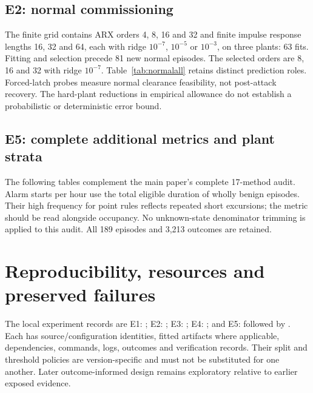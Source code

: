 \documentclass[11pt]{article}
\begin{document}
\subsection{E2: normal commissioning}
The finite grid contains ARX orders 4, 8, 16 and 32 and finite impulse response lengths 16, 32 and 64, each with ridge $10^{-7}$, $10^{-5}$ or $10^{-3}$, on three plants: 63 fits. Fitting and selection precede 81 new normal episodes. The selected orders are 8, 16 and 32 with ridge $10^{-7}$. Table~\ref{tab:normalall} retains distinct prediction roles. Forced-latch probes measure normal clearance feasibility, not post-attack recovery. The hard-plant reductions in empirical allowance do not establish a probabilistic or deterministic error bound.
\begin{table}[htbp]\centering\small
\caption{E2 complete normal-reference comparison. Each row has 29,700 eligible observations and 108 forced-latch probes. Selected reference and selected ARX are identical and appear once.}\label{tab:normalall}
\setlength{\tabcolsep}{4pt}
\end{table}
\subsection{E5: complete additional metrics and plant strata}
The following tables complement the main paper's complete 17-method audit. Alarm starts per hour use the total eligible duration of wholly benign episodes. Their high frequency for point rules reflects repeated short excursions; the metric should be read alongside occupancy. No unknown-state denominator trimming is applied to this audit. All 189 episodes and 3,213 outcomes are retained.
\begin{table}[htbp]\centering\small
\caption{Final audit: unadjusted point precision/recall, benign occupancy, alarm starts per benign hour and missed events.}

\end{table}
\begin{table}[htbp]\centering\small
\caption{Primary base-dual versus RBF-dual comparison by plant. Every plant has 29,700 benign points and 36 attack events.}
\setlength{\tabcolsep}{4pt}
\end{table}
\clearpage


\section{Reproducibility, resources and preserved failures}
The local experiment records are E1: ; E2: ; E3: ; E4: ; and E5:  followed by . Each has source/configuration identities, fitted artifacts where applicable, dependencies, commands, logs, outcomes and verification records. Their split and threshold policies are version-specific and must not be substituted for one another. Later outcome-informed design remains exploratory relative to earlier exposed evidence.
\end{document}
